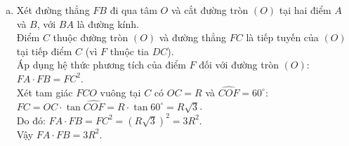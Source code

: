\begin{bt}
{\begin{enumerate}[a)]
    \item Xét đường thẳng $FB$ đi qua tâm $O$ và cắt đường tròn $(O)$ tại hai điểm $A$ và $B$, với $BA$ là đường kính.\\
    Điểm $C$ thuộc đường tròn $(O)$ và đường thẳng $FC$ là tiếp tuyến của $(O)$ tại tiếp điểm $C$ (vì $F$ thuộc tia $DC$).\\
    Áp dụng hệ thức phương tích của điểm $F$ đối với đường tròn $(O)$:
    $FA \cdot FB = FC^2$.\\
    Xét tam giác $FCO$ vuông tại $C$ có $OC = R$ và $\widehat{COF} = 60^\circ$:\\
    $FC = OC \cdot \tan \widehat{COF} = R \cdot \tan 60^\circ = R\sqrt{3}$.\\
    Do đó:
    $FA \cdot FB = FC^2 = (R\sqrt{3})^2 = 3R^2$.\\
    Vậy $FA \cdot FB = 3R^2$.
\end{enumerate}
}
\end{bt}
